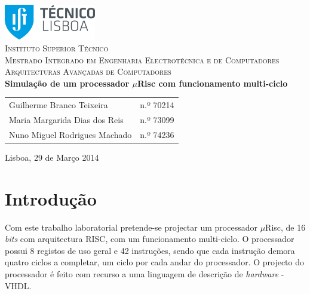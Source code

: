 \documentclass[11pt]{article}
\numberwithin{equation}{section}
\begin{document}
\begin{titlepage}
\begin{center}

\hfill \break
\hfill \break

\includegraphics[width=0.3\textwidth]{./logo}~\\[1cm]

\textsc{\LARGE Instituto Superior Técnico}\\[0.25cm]
\textsc{\Large Mestrado Integrado em Engenharia Electrotécnica e de Computadores}\\[1.8cm]
\textsc{\huge Arquitecturas Avançadas de Computadores}\\[0.25cm]

{\huge \bfseries Simulação de um processador $\mu$Risc com funcionamento multi-ciclo\\[1.2cm]}

\begin{tabular}{ l l }
Guilherme Branco Teixeira & \hspace{2mm} n.º 70214 \\ 
Maria Margarida Dias dos Reis & \hspace{2mm} n.º 73099 \\
Nuno Miguel Rodrigues Machado & \hspace{2mm} n.º 74236 
\end{tabular}

\vfill

{\large Lisboa, 29 de Março 2014} 

\end{center}
\end{titlepage}

\clearpage

\tableofcontents
\pagebreak

\clearpage
{}

\section{Introdução}

Com este trabalho laboratorial pretende-se projectar um processador $\mu$Risc, de 16 \textit{bits} com arquitectura RISC, com um funcionamento multi-ciclo. O processador possui 8 registos de uso geral e 42 instruções, sendo que cada instrução demora quatro ciclos a completar, um ciclo por cada andar do processador. O projecto do processador é feito com recurso a uma linguagem de descrição de \textit{hardware} - VHDL.
\end{document}
